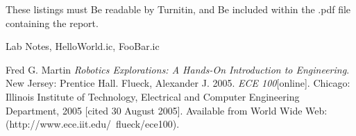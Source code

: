 \documentclass[a4paper, 11pt]{article}
\begin{document}
These listings must 
Be readable by Turnitin, and
Be included within the .pdf file containing the report.


Lab Notes, HelloWorld.ic, FooBar.ic

\begin{thebibliography}{9}
 Fred G. Martin \emph{Robotics Explorations: A Hands-On Introduction to Engineering}. New Jersey: Prentice Hall.
  Flueck, Alexander J. 2005. \emph{ECE 100}[online]. Chicago: Illinois Institute of Technology, Electrical and Computer Engineering Department, 2005 [cited 30
August 2005]. Available from World Wide Web: (http://www.ece.iit.edu/~flueck/ece100).
\end{thebibliography}
\end{document}
